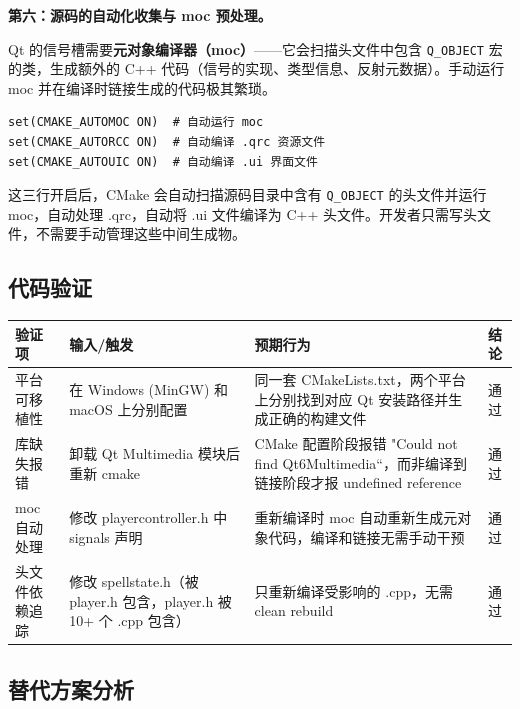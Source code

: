 \documentclass[utf8]{ctexart}
\begin{document}
\textbf{第六：源码的自动化收集与 moc 预处理。}

Qt 的信号槽需要\textbf{元对象编译器（moc）}——它会扫描头文件中包含 \texttt{Q\_OBJECT} 宏的类，生成额外的 C++ 代码（信号的实现、类型信息、反射元数据）。手动运行 moc 并在编译时链接生成的代码极其繁琐。

\begin{verbatim}
set(CMAKE_AUTOMOC ON)  # 自动运行 moc
set(CMAKE_AUTORCC ON)  # 自动编译 .qrc 资源文件
set(CMAKE_AUTOUIC ON)  # 自动编译 .ui 界面文件
\end{verbatim}

\noindent 这三行开启后，CMake 会自动扫描源码目录中含有 \texttt{Q\_OBJECT} 的头文件并运行 moc，自动处理 .qrc，自动将 .ui 文件编译为 C++ 头文件。开发者只需写头文件，不需要手动管理这些中间生成物。

\subsection{代码验证}

\begin{longtable}{p{}p{}p{}p{}}
\toprule
\textbf{验证项} & \textbf{输入/触发} & \textbf{预期行为} & \textbf{结论} \\
\midrule
\endfirsthead
\bottomrule
\endhead
平台可移植性 & 在 Windows (MinGW) 和 macOS 上分别配置 & 同一套 CMakeLists.txt，两个平台上分别找到对应 Qt 安装路径并生成正确的构建文件 & 通过 \\
\hline
库缺失报错 & 卸载 Qt Multimedia 模块后重新 cmake & CMake 配置阶段报错 "Could not find Qt6Multimedia“，而非编译到链接阶段才报 undefined reference & 通过 \\
\hline
moc 自动处理 & 修改 playercontroller.h 中 signals 声明 & 重新编译时 moc 自动重新生成元对象代码，编译和链接无需手动干预 & 通过 \\
\hline
头文件依赖追踪 & 修改 spellstate.h（被 player.h 包含，player.h 被 10+ 个 .cpp 包含）& 只重新编译受影响的 .cpp，无需 clean rebuild & 通过 \\
\bottomrule
\end{longtable}

\subsection{替代方案分析}
\end{document}
